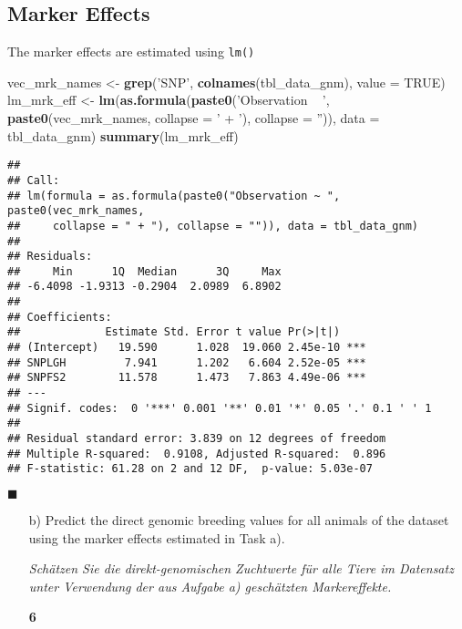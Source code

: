 \documentclass[
]{article}
\newenvironment{Shaded}{\begin{snugshade}}{\end{snugshade}}
\newcommand{\DataTypeTok}[1]{\textcolor[rgb]{0.13,0.29,0.53}{#1}}
\newcommand{\KeywordTok}[1]{\textcolor[rgb]{0.13,0.29,0.53}{\textbf{#1}}}
\newcommand{\NormalTok}[1]{#1}
\newcommand{\OtherTok}[1]{\textcolor[rgb]{0.56,0.35,0.01}{#1}}
\newcommand{\StringTok}[1]{\textcolor[rgb]{0.31,0.60,0.02}{#1}}
\newcommand{\points}[1]
{\begin{flushright}\textbf{#1}\end{flushright}}
\newcommand{\solend}
{\vspace{2ex}$\blacksquare$}
\begin{document}
\hypertarget{marker-effects}{%
\subsection{Marker Effects}\label{marker-effects}}

The marker effects are estimated using \texttt{lm()}

\begin{Shaded}
\begin{Highlighting}[]
\NormalTok{vec_mrk_names <-}\StringTok{ }\KeywordTok{grep}\NormalTok{(}\StringTok{'SNP'}\NormalTok{, }\KeywordTok{colnames}\NormalTok{(tbl_data_gnm), }\DataTypeTok{value =} \OtherTok{TRUE}\NormalTok{) }
\NormalTok{lm_mrk_eff <-}\StringTok{ }\KeywordTok{lm}\NormalTok{(}\KeywordTok{as.formula}\NormalTok{(}\KeywordTok{paste0}\NormalTok{(}\StringTok{'Observation ~ '}\NormalTok{, }\KeywordTok{paste0}\NormalTok{(vec_mrk_names, }\DataTypeTok{collapse =} \StringTok{' + '}\NormalTok{), }\DataTypeTok{collapse =} \StringTok{''}\NormalTok{)), }\DataTypeTok{data =}\NormalTok{ tbl_data_gnm)}
\KeywordTok{summary}\NormalTok{(lm_mrk_eff)}
\end{Highlighting}
\end{Shaded}

\begin{verbatim}
## 
## Call:
## lm(formula = as.formula(paste0("Observation ~ ", paste0(vec_mrk_names, 
##     collapse = " + "), collapse = "")), data = tbl_data_gnm)
## 
## Residuals:
##     Min      1Q  Median      3Q     Max 
## -6.4098 -1.9313 -0.2904  2.0989  6.8902 
## 
## Coefficients:
##             Estimate Std. Error t value Pr(>|t|)    
## (Intercept)   19.590      1.028  19.060 2.45e-10 ***
## SNPLGH         7.941      1.202   6.604 2.52e-05 ***
## SNPFS2        11.578      1.473   7.863 4.49e-06 ***
## ---
## Signif. codes:  0 '***' 0.001 '**' 0.01 '*' 0.05 '.' 0.1 ' ' 1
## 
## Residual standard error: 3.839 on 12 degrees of freedom
## Multiple R-squared:  0.9108, Adjusted R-squared:  0.896 
## F-statistic: 61.28 on 2 and 12 DF,  p-value: 5.03e-07
\end{verbatim}

\solend

\clearpage
\pagebreak

\begin{enumerate}
\item[b)] Predict the direct genomic breeding values for all animals of the dataset using the marker effects estimated in Task a). 

\textit{ Schätzen Sie die direkt-genomischen Zuchtwerte für alle Tiere im Datensatz unter Verwendung der aus Aufgabe a) geschätzten Markereffekte.}
\points{6}
\end{enumerate}
\end{document}
